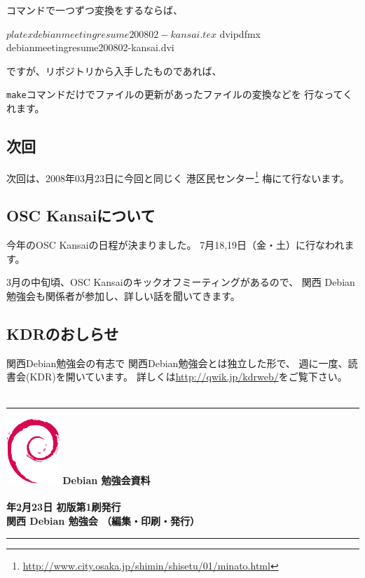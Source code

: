 \documentclass[mingoth,a4paper]{jsarticle}
\newcommand{\debmtgyear}{2008}
\newcommand{\debmtgdate}{23}
\newcommand{\debmtgmonth}{2}
\begin{document}
コマンドで一つずつ変換をするならば、
\begin{commandline}
 $ platex debianmeetingresume200802-kansai.tex
 $ dvipdfmx debianmeetingresume200802-kansai.dvi
\end{commandline}

ですが、リポジトリから入手したものであれば、


\texttt{make}コマンドだけでファイルの更新があったファイルの変換などを
行なってくれます。


\subsection{次回}
次回は、2008年03月23日に今回と同じく
港区民センター\footnote{\url{http://www.city.osaka.jp/shimin/shisetu/01/minato.html}}
梅にて行ないます。

\subsection{OSC Kansaiについて}
今年のOSC Kansaiの日程が決まりました。
7月18,19日（金・土）に行なわれます。

3月の中旬頃、OSC Kansaiのキックオフミーティングがあるので、
関西 Debian 勉強会も関係者が参加し、詳しい話を聞いてきます。

\subsection{KDRのおしらせ}
関西Debian勉強会の有志で
関西Debian勉強会とは独立した形で、
週に一度、読書会(KDR)を開いています。
詳しくは\url{http://qwik.jp/kdrweb/}をご覧下さい。
　
\printindex
 \cleartooddpage

 \begin{minipage}[b]{0.2\hsize}
 \end{minipage}
 \begin{minipage}[b]{0.8\hsize}

 \vspace*{15cm}
 \rule{\hsize}{1mm}
 \vspace{2mm}
 \includegraphics[width=2cm]{image200502/openlogo-nd.eps}
 \noindent \Large \bf Debian 勉強会資料\\ \\
 \noindent \normalfont \debmtgyear{}年\debmtgmonth{}月\debmtgdate{}日 \hspace{5mm}  初版第1刷発行\\
 \noindent \normalfont 関西 Debian 勉強会 （編集・印刷・発行）\\
 \rule{\hsize}{1mm}
 \end{minipage}
\end{document}
